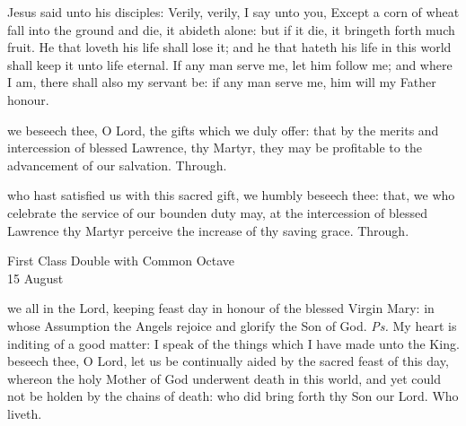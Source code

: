 

 Jesus said unto his disciples: Verily, verily, I say unto you, Except a corn of wheat fall into the ground and die, it abideth alone: but if it die, it bringeth forth much fruit. He that loveth his life shall lose it; and he that hateth his life in this world shall keep it unto life eternal. If any man serve me, let him follow me; and where I am, there shall also my servant be: if any man serve me, him will my Father honour.


\vspace{-1ex}

\secret
{} we beseech thee, O Lord, the gifts which we duly offer: that by the merits and intercession of blessed Lawrence, thy Martyr, they may be profitable to the advancement of our salvation. Through.


\vspace{-1ex}

\postcommunion
{} who hast satisfied us with this sacred gift, we humbly beseech thee: that, we who celebrate the service of our bounden duty may, at the intercession of blessed Lawrence thy Martyr perceive the increase of thy saving grace. Through.


\begin{inhead}
    {First Class Double with Common Octave\\
15 August}
\end{inhead}

\introit
{} we all in the Lord, keeping feast day in honour of the blessed Virgin Mary: in whose Assumption the Angels rejoice and glorify the Son of God. \textit{Ps.} My heart is inditing of a good matter: I speak of the things which I have made unto the King.
\collect
{} beseech thee, O Lord, let us be continually aided by the sacred feast of this day, whereon the holy Mother of God underwent death in this world, and yet could not be holden by the chains of death: who did bring forth thy Son our Lord. Who liveth.

